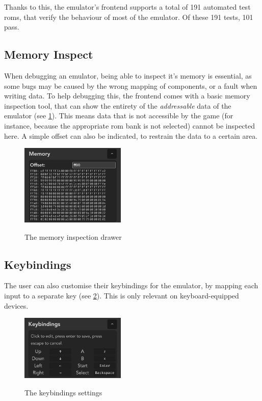 \documentclass[11pt]{informatics-report}
\begin{document}
Thanks to this, the emulator's frontend supports a total of 191 automated test \glspl{rom}, that verify the behaviour of most of the emulator. Of these 191 tests, 101 pass.

\subsection{Memory Inspect}

When debugging an emulator, being able to inspect it's memory is essential, as some bugs may be caused by the wrong mapping of components, or a fault when writing data. To help debugging this, the frontend comes with a basic memory inspection tool, that can show the entirety of the \textit{addressable} data of the emulator (see \ref{fig:memory-inspect}). This means data that is not accessible by the game (for instance, because the appropriate \gls{rom} bank is not selected) cannot be inspected here. A simple offset can also be indicated, to restrain the data to a certain area.

\begin{figure}[h]
    \centering
    \includegraphics[width=5cm]{images/memory-inspect}\\
    \caption{The memory inspection drawer}
    \label{fig:memory-inspect}
\end{figure}

\subsection{Keybindings}

The user can also customise their keybindings for the emulator, by mapping each input to a separate key (see \ref{fig:keybindings}). This is only relevant on keyboard-equipped devices.

\begin{figure}[h]
    \centering
    \includegraphics[width=5cm]{images/keybindings}\\
    \caption{The keybindings settings}
    \label{fig:keybindings}
\end{figure}
\end{document}
